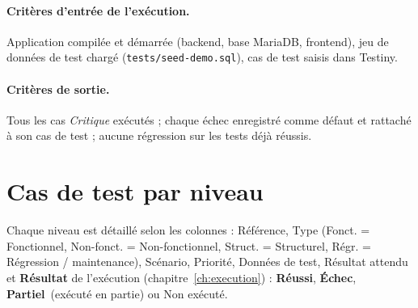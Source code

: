 \documentclass[12pt,a4paper]{report}
\newcommand{\ok}{\textcolor{okgreen}{\textbf{Réussi}}}
\newcommand{\ko}{\textcolor{kored}{\textbf{Échec}}}
\newcommand{\pa}{\textcolor{paorange}{\textbf{Partiel}}}
\newcommand{\nex}{\textcolor{negray}{Non exécuté}}
\begin{document}
\paragraph{Critères d'entrée de l'exécution.} Application compilée et démarrée (backend, base MariaDB, frontend), jeu de données de test chargé (\texttt{tests/seed-demo.sql}), cas de test saisis dans Testiny.

\paragraph{Critères de sortie.} Tous les cas \textit{Critique} exécutés ; chaque échec enregistré comme défaut et rattaché à son cas de test ; aucune régression sur les tests déjà réussis.

\section{Cas de test par niveau}
Chaque niveau est détaillé selon les colonnes : Référence, Type (Fonct. = Fonctionnel, Non-fonct. = Non-fonctionnel, Struct. = Structurel, Régr. = Régression / maintenance), Scénario, Priorité, Données de test, Résultat attendu et \textbf{Résultat} de l'exécution (chapitre~\ref{ch:execution}) : \ok, \ko, \pa\ (exécuté en partie) ou \nex.
\end{document}
